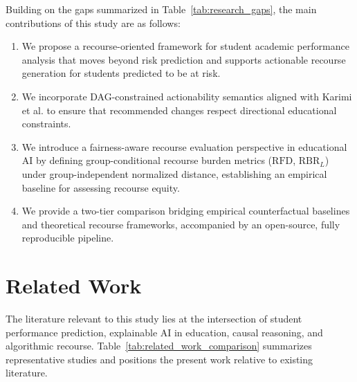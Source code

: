 \documentclass[11pt]{article}
\newcommand{\hlblock}[1]{\vspace{1mm}\noindent\colorbox{yellow!30}{\parbox{\dimexpr\linewidth-2\fboxsep\relax}{\sloppy #1\par}}\vspace{1mm}}
\begin{document}
Building on the gaps summarized in Table~\ref{tab:research_gaps}, the main contributions of this study are as follows:
\begin{enumerate}
    \item We propose a recourse-oriented framework for student academic performance analysis that moves beyond risk prediction and supports actionable recourse generation for students predicted to be at risk.
    \item We incorporate DAG-constrained actionability semantics aligned with Karimi et al. \cite{Karimi2021} to ensure that recommended changes respect directional educational constraints.
    \item \hlblock{We introduce a fairness-aware recourse evaluation perspective in educational AI by defining group-conditional recourse burden metrics ($\text{RFD}$, $\text{RBR}_L$) under group-independent normalized distance, establishing an empirical baseline for assessing recourse equity.}
    \item We provide a two-tier comparison bridging empirical counterfactual baselines and theoretical recourse frameworks, accompanied by an open-source, fully reproducible pipeline.
\end{enumerate}

\section{Related Work}
\label{sec:related_work}

The literature relevant to this study lies at the intersection of student performance prediction, explainable AI in education, causal reasoning, and algorithmic recourse. Table~\ref{tab:related_work_comparison} summarizes representative studies and positions the present work relative to existing literature.
\end{document}
